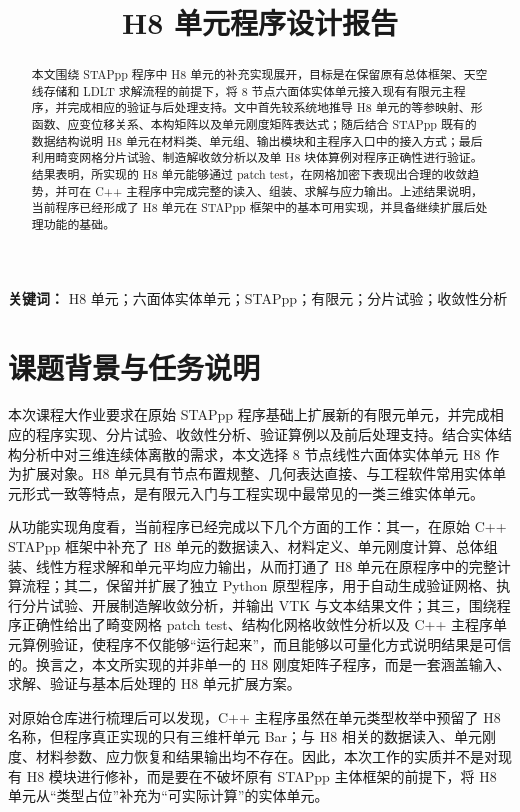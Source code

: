 \documentclass[12pt,a4paper]{article}
\title{H8 单元程序设计报告}
\author{}
\date{}
\begin{document}
\maketitle

\begin{abstract}
本文围绕 STAPpp 程序中 H8 单元的补充实现展开，目标是在保留原有总体框架、天空线存储和 LDLT 求解流程的前提下，将 8 节点六面体实体单元接入现有有限元主程序，并完成相应的验证与后处理支持。文中首先较系统地推导 H8 单元的等参映射、形函数、应变位移关系、本构矩阵以及单元刚度矩阵表达式；随后结合 STAPpp 既有的数据结构说明 H8 单元在材料类、单元组、输出模块和主程序入口中的接入方式；最后利用畸变网格分片试验、制造解收敛分析以及单 H8 块体算例对程序正确性进行验证。结果表明，所实现的 H8 单元能够通过 patch test，在网格加密下表现出合理的收敛趋势，并可在 C++ 主程序中完成完整的读入、组装、求解与应力输出。上述结果说明，当前程序已经形成了 H8 单元在 STAPpp 框架中的基本可用实现，并具备继续扩展后处理功能的基础。
\end{abstract}

\noindent\textbf{关键词：} H8 单元；六面体实体单元；STAPpp；有限元；分片试验；收敛性分析

\section{课题背景与任务说明}

本次课程大作业要求在原始 STAPpp 程序基础上扩展新的有限元单元，并完成相应的程序实现、分片试验、收敛性分析、验证算例以及前后处理支持。结合实体结构分析中对三维连续体离散的需求，本文选择 8 节点线性六面体实体单元 H8 作为扩展对象。H8 单元具有节点布置规整、几何表达直接、与工程软件常用实体单元形式一致等特点，是有限元入门与工程实现中最常见的一类三维实体单元。

从功能实现角度看，当前程序已经完成以下几个方面的工作：其一，在原始 C++ STAPpp 框架中补充了 H8 单元的数据读入、材料定义、单元刚度计算、总体组装、线性方程求解和单元平均应力输出，从而打通了 H8 单元在原程序中的完整计算流程；其二，保留并扩展了独立 Python 原型程序，用于自动生成验证网格、执行分片试验、开展制造解收敛分析，并输出 VTK 与文本结果文件；其三，围绕程序正确性给出了畸变网格 patch test、结构化网格收敛性分析以及 C++ 主程序单元算例验证，使程序不仅能够“运行起来”，而且能够以可量化方式说明结果是可信的。换言之，本文所实现的并非单一的 H8 刚度矩阵子程序，而是一套涵盖输入、求解、验证与基本后处理的 H8 单元扩展方案。

对原始仓库进行梳理后可以发现，C++ 主程序虽然在单元类型枚举中预留了 H8 名称，但程序真正实现的只有三维杆单元 Bar；与 H8 相关的数据读入、单元刚度、材料参数、应力恢复和结果输出均不存在。因此，本次工作的实质并不是对现有 H8 模块进行修补，而是要在不破坏原有 STAPpp 主体框架的前提下，将 H8 单元从“类型占位”补充为“可实际计算”的实体单元。
\end{document}
